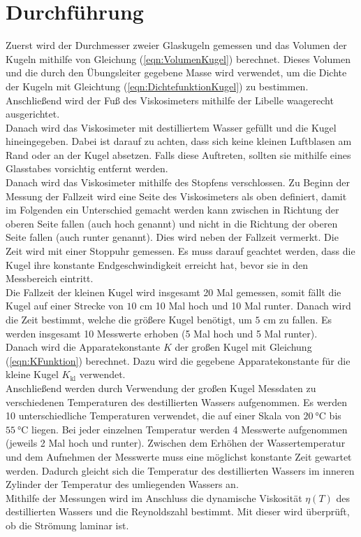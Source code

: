 \section{Durchführung}
\label{sec:Durchführung}
Zuerst wird der Durchmesser zweier Glaskugeln gemessen und das Volumen der Kugeln mithilfe von Gleichung
(\ref{eqn:VolumenKugel}) berechnet. Dieses Volumen und die durch den Übungsleiter gegebene Masse 
wird verwendet, um die Dichte der Kugeln mit Gleichtung 
(\ref{eqn:DichtefunktionKugel}) zu bestimmen.  
Anschließend wird der Fuß des Viskosimeters mithilfe der Libelle waagerecht ausgerichtet. \\
Danach wird das Viskosimeter mit destilliertem Wasser gefüllt und die Kugel hineingegeben. 
Dabei ist darauf zu achten, dass sich keine kleinen Luftblasen am Rand oder an der Kugel absetzen. 
Falls diese Auftreten, sollten sie mithilfe eines Glasstabes vorsichtig entfernt werden. \\
Danach wird 
das Viskosimeter mithilfe des Stopfens verschlossen. Zu Beginn der Messung der Fallzeit wird eine Seite 
des Viskosimeters als oben definiert, damit im Folgenden ein Unterschied gemacht werden kann zwischen 
\glqq in Richtung der oberen Seite fallen\grqq{} (auch \glqq hoch\grqq{} genannt) und \glqq nicht in die Richtung der 
oberen Seite fallen\grqq{}
(auch \glqq runter\grqq{} genannt). Dies wird neben der Fallzeit vermerkt. Die Zeit wird mit einer Stoppuhr gemessen. 
Es muss darauf geachtet werden, dass
die Kugel ihre konstante Endgeschwindigkeit erreicht hat, bevor sie in den Messbereich eintritt.\\ 
Die Fallzeit der kleinen Kugel wird insgesamt 20 Mal gemessen, somit fällt die Kugel auf einer Strecke 
von $10$ \unit{\centi\meter} 10 Mal \glqq hoch\grqq{} und 10 Mal \glqq runter\grqq{}. 
Danach wird die Zeit bestimmt, welche die größere Kugel benötigt, um $5$ \unit{\centi\meter} zu fallen.
Es werden insgesamt 10 Messwerte erhoben (5 Mal \glqq hoch\grqq{} und 5 Mal \glqq runter\grqq{}).\\
Danach wird die Apparatekonstante $K$ der großen Kugel mit Gleichung (\ref{eqn:KFunktion}) berechnet. Dazu wird die gegebene 
Apparatekonstante für die kleine Kugel $K_{\text{kl}}$ %
verwendet. \\
Anschließend werden durch Verwendung der großen Kugel Messdaten zu verschiedenen Temperaturen des 
destillierten Wassers aufgenommen. 
Es werden 10 unterschiedliche Temperaturen verwendet, die auf einer Skala von $\SI{20}{\celsius}$ bis 
$\SI{55}{\celsius}$ liegen. Bei jeder einzelnen Temperatur werden 4 Messwerte aufgenommen (jeweils 2 Mal 
\glqq hoch\grqq{} und \glqq runter\grqq{}).
Zwischen dem Erhöhen der Wassertemperatur und dem Aufnehmen der Messwerte muss eine möglichst konstante Zeit 
gewartet werden. Dadurch gleicht sich die Temperatur des destillierten Wassers im inneren Zylinder der Temperatur des umliegenden 
Wassers an. \\
Mithilfe der Messungen wird im Anschluss die dynamische Viskosität $\eta(T)$ des destillierten Wassers und die 
Reynoldszahl bestimmt. Mit dieser wird überprüft, ob die Strömung laminar ist.

